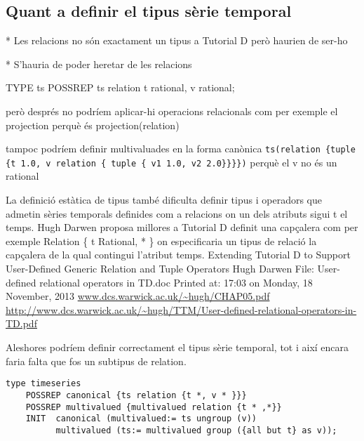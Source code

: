 \subsection{Quant a definir el tipus sèrie temporal}
\label{sec:implementacio:tipus-relacional}

\todo{}

* Les relacions no són exactament un tipus a Tutorial D però haurien de ser-ho

* S'hauria de poder heretar de les relacions




TYPE ts POSSREP {ts relation {t rational, v rational}};

però després no podríem aplicar-hi operacions relacionals com per exemple el projection perquè és projection(relation)

tampoc podríem definir multivaluades en la forma canònica \verb+ts(relation {tuple {t 1.0, v relation { tuple { v1 1.0, v2 2.0}}}})+ perquè el v no és un rational






La definició estàtica de tipus també dificulta definir tipus i operadors que admetin sèries temporals definides com a relacions on un dels atributs sigui t el temps. Hugh Darwen proposa millores a Tutorial D definit una capçalera com per exemple Relation \{ t Rational, * \} on especificaria un tipus de relació la capçalera de la qual contingui l'atribut temps.
Extending Tutorial D to Support User-Defined
Generic Relation and Tuple Operators
Hugh Darwen
File: User-defined relational operators in TD.doc
Printed at: 17:03 on Monday, 18 November, 2013
\url{www.dcs.warwick.ac.uk/~hugh/CHAP05.pdf}
\url{http://www.dcs.warwick.ac.uk/~hugh/TTM/User-defined-relational-operators-in-TD.pdf}


Aleshores podríem definir correctament el tipus sèrie temporal, tot i així encara faria falta que fos un subtipus de relation.

\begin{lstlisting}[style=tutorialD]
type timeseries
	POSSREP canonical {ts relation {t *, v * }}}
	POSSREP multivalued {multivalued relation {t * ,*}} 
	INIT  canonical (multivalued:= ts ungroup (v))
	      multivalued (ts:= multivalued group ({all but t} as v));
\end{lstlisting}



